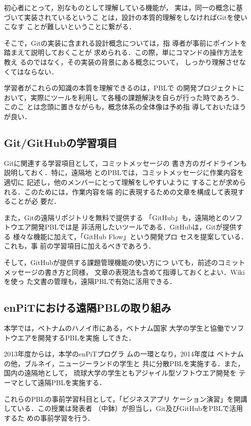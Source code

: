 \documentclass[a4j, 12Q, twocolumn, twoside]{jsarticle}
\begin{document}
初心者にとって，別なものとして理解している機能が，
実は，同一の概念に基づいて実装されているというこ
とは，設計の本質的理解をしなければGitを使いこなす
ことが難しいということに繋がる．

そこで，Gitの実装に含まれる設計概念については，指
導者が事前にポイントを踏まえて説明しておくことが
求められる．この際，単にコマンドの操作方法を教え
るのではなく，その実装の背景にある概念について，
しっかり理解させなくてはならない．

学習者がこれらの知識の本質を理解できるのは，PBLで
の開発プロジェクトにおいて，実際にツールを利用し
て各種の課題解決を自らが行った時であろう．このこ
とは念頭に置きながらも，概念体系の全体像は予め指
導しておいたほうが良い．

\subsection{Git/GitHubの学習項目}
Gitに関連する学習項目として，コミットメッセージの
書き方のガイドラインも説明しておく．特に，遠隔地
とのPBLでは，コミットメッセージに作業内容を適切に
記述し，他のメンバーにとって理解をしやすいように
することが求められる．このためには，作業内容を端
的に表現するための文章を構成して表現することが必
要だ．

また，Gitの遠隔リポジトリを無料で提供する
「GitHub」も，遠隔地とのソフトウエア開発PBLでは是
非活用したいツールである．GitHubは，Gitが提供する
様々な機能に加えて，「GitHub Flow」という開発プロ
セスを提案している\cite{chacon:2014}．これも，事
前の学習項目に加えるべきであろう．

そして，GitHubが提供する課題管理機能の使い方につ
いても，前述のコミットメッセージの書き方と同様，
文章の表現法も含めて指導しておくとよい．Wikiを使っ
た文書の管理も，遠隔PBLで有効に活用できる．

\subsection{enPiTにおける遠隔PBLの取り組み}
本学では，ベトナムのハノイ市にある，ベトナム国家
大学の学生と協働でソフトウエアを開発するPBLを実施
してきた．

2013年度からは，本学のenPiTプログラ
ム\cite{enPiT_aiit:2013}の一環となり，2014年度は
ベトナムの他，ブルネイ，ニュージーランドの学生と
共に分散PBLを実施する．また，国内の遠隔地として，
琉球大学の学生ともアジャイル型ソフトウエア開発を
テーマとして遠隔PBLを実施する．

これらのPBLの事前学習科目として，「ビジネスアプリ
ケーション演習」を開講している．この授業は発表者
（中鉢）が担当し，Git及びGitHubをPBLで活用するた
めの事前学習を行う．
\end{document}
